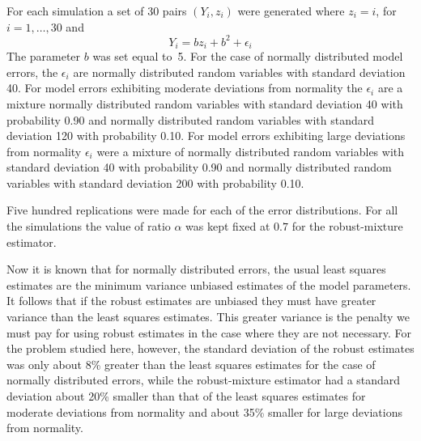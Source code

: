 \documentclass[12pt]{book}
\begin{document}
For each simulation a set of 30 pairs $(Y_i,z_i)$ were generated
where $z_i=i$, \hbox{for $i=1,\ldots,30$} and
$$Y_i=bz_i+b^2+\epsilon_i$$
The parameter $b$ was set equal to~5.
For the case of normally distributed model errors,
the $\epsilon_i$ are normally distributed random
variables with standard deviation 40.
For model errors exhibiting moderate deviations from normality 
the $\epsilon_i$ are a mixture normally 
distributed random
variables with standard deviation 40 with probability 0.90 and
normally distributed random variables 
with standard deviation 120 with probability 0.10.
For model errors exhibiting large deviations 
from normality $\epsilon_i$ were a mixture of normally 
distributed random
variables with standard deviation 40 with probability 0.90 and
normally distributed random variables with 
standard deviation 200 with probability 0.10.

Five hundred replications were made for each of the error distributions.
For all the simulations the value of ratio $\alpha$
was kept fixed at $0.7$ for the robust-mixture estimator. 

Now it is known that for normally distributed errors,
the usual least squares estimates are the minimum variance unbiased
estimates of the model parameters. It follows that if the
robust estimates are unbiased they must have greater variance than
the least squares estimates. This greater variance is the penalty we must
pay for using robust estimates in the case where they are not necessary.
For the problem studied here, however, the standard deviation of the
robust estimates was only about 8\% greater than the least squares
estimates for the case of normally distributed errors, while the
robust-mixture estimator had a standard deviation about 20\% smaller
than that of the least squares estimates for moderate deviations from
normality and about 35\% smaller for large deviations from normality.
\end{document}
